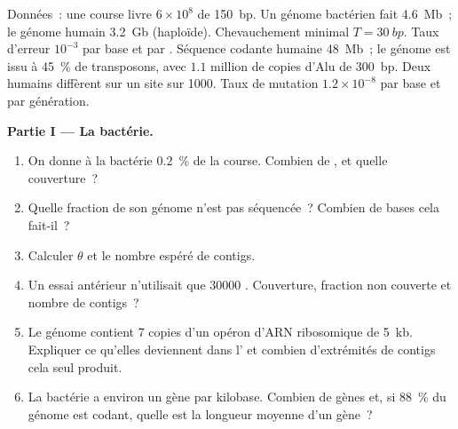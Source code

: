 \begin{problem}
\label{pb:b3:genomics:1}
Données~: une course livre $6\times 10^{8}$  de \qty{150}{bp}.
Un génome bactérien fait \qty{4.6}{Mb}~; le génome humain \qty{3.2}{Gb}
(haploïde). Chevauchement minimal $T = \qty{30}{bp}$. Taux d'erreur
$10^{-3}$ par base et par . Séquence codante humaine
\qty{48}{Mb}~; le génome est issu à \qty{45}{\%} de transposons, avec
$1.1$ million de copies d'Alu de \qty{300}{bp}. Deux humains diffèrent
sur un site sur \num{1000}. Taux de mutation $1.2\times 10^{-8}$ par
base et par génération.

\medskip
\noindent\textbf{Partie I --- La bactérie.}
\begin{enumerate}
  \item On donne à la bactérie \qty{0.2}{\%} de la course. Combien de
        , et quelle couverture~?
  \item Quelle fraction de son génome n'est pas séquencée~? Combien de
        bases cela fait-il~?
  \item Calculer $\theta$ et le nombre espéré de contigs.
  \item Un essai antérieur n'utilisait que \num{30000} .
        Couverture, fraction non couverte et nombre de contigs~?
  \item Le génome contient \num{7} copies d'un opéron d'ARN
        ribosomique de \qty{5}{kb}. Expliquer ce qu'elles deviennent
        dans l' et combien d'extrémités de contigs cela seul
        produit.
  \item La bactérie a environ un gène par kilobase. Combien de gènes
        et, si \qty{88}{\%} du génome est codant, quelle est la
        longueur moyenne d'un gène~?
\end{enumerate}


\end{problem}
